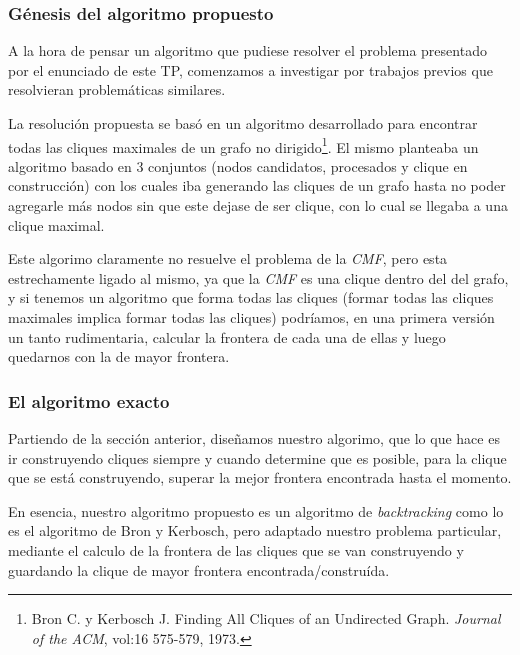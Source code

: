 \subsubsection{G\'enesis del algoritmo propuesto}
\par A la hora de pensar un algoritmo que pudiese resolver el problema presentado
    por el enunciado de este TP, comenzamos a investigar por trabajos previos que
    resolvieran problem\'aticas similares.

\par La resoluci\'on propuesta se bas\'o en un algoritmo desarrollado para encontrar
    todas las cliques maximales de un grafo no dirigido\footnote{%
    Bron C. y Kerbosch J. Finding All Cliques of an Undirected Graph. \emph{Journal
    of the ACM}, vol:16 575-579, 1973.}. El mismo planteaba un algoritmo basado en
    3 conjuntos (nodos candidatos, procesados y clique en construcci\'on) con los
    cuales iba generando las cliques de un grafo hasta no poder agregarle m\'as nodos
    sin que este dejase de ser clique, con lo cual se llegaba a una clique maximal.

\par Este algorimo claramente no resuelve el problema de la \emph{CMF}, pero esta
    estrechamente ligado al mismo, ya que la \emph{CMF} es una clique dentro del
    del grafo, y si tenemos un algoritmo que forma todas las cliques (formar todas
    las cliques maximales implica formar todas las cliques) podr\'iamos, en una
    primera versi\'on un tanto rudimentaria, calcular la frontera de cada una
    de ellas y luego quedarnos con la de mayor frontera.

\subsubsection{El algoritmo exacto}\label{backtracking:explicacion}
\par Partiendo de la secci\'on anterior, dise\~namos nuestro algorimo, que lo que hace es
    ir construyendo cliques siempre y cuando determine que es posible, para la
    clique que se est\'a construyendo, superar la mejor frontera encontrada hasta
    el momento.

\par En esencia, nuestro algoritmo propuesto es un algoritmo de \emph{backtracking}
    como lo es el algoritmo de Bron y Kerbosch, pero adaptado nuestro problema
    particular, mediante el calculo de la frontera de las cliques que se van
    construyendo y guardando la clique de mayor frontera encontrada/constru\'ida.

